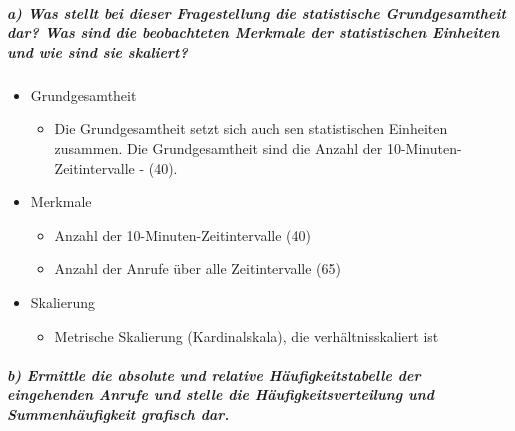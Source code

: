\documentclass[
]{article}
\providecommand{\tightlist}{%
  \setlength{\itemsep}{0pt}\setlength{\parskip}{0pt}}
\begin{document}
\hypertarget{a-was-stellt-bei-dieser-fragestellung-die-statistische-grundgesamtheit-dar-was-sind-die-beobachteten-merkmale-der-statistischen-einheiten-und-wie-sind-sie-skaliert}{%
\subparagraph{\texorpdfstring{\textbf{a) Was stellt bei dieser
Fragestellung die statistische Grundgesamtheit dar? Was sind die
beobachteten Merkmale der statistischen Einheiten und wie sind sie
skaliert?}}{a) Was stellt bei dieser Fragestellung die statistische Grundgesamtheit dar? Was sind die beobachteten Merkmale der statistischen Einheiten und wie sind sie skaliert?}}\label{a-was-stellt-bei-dieser-fragestellung-die-statistische-grundgesamtheit-dar-was-sind-die-beobachteten-merkmale-der-statistischen-einheiten-und-wie-sind-sie-skaliert}}

\begin{itemize}
\tightlist
\item
  Grundgesamtheit

  \begin{itemize}
  \tightlist
  \item
    Die Grundgesamtheit setzt sich auch sen statistischen Einheiten
    zusammen. Die Grundgesamtheit sind die Anzahl der
    10-Minuten-Zeitintervalle - (40).
  \end{itemize}
\item
  Merkmale

  \begin{itemize}
  \tightlist
  \item
    Anzahl der 10-Minuten-Zeitintervalle (40)
  \item
    Anzahl der Anrufe über alle Zeitintervalle (65)
  \end{itemize}
\item
  Skalierung

  \begin{itemize}
  \tightlist
  \item
    Metrische Skalierung (Kardinalskala), die verhältnisskaliert ist
  \end{itemize}
\end{itemize}

\hypertarget{b-ermittle-die-absolute-und-relative-huxe4ufigkeitstabelle-der-eingehenden-anrufe-und-stelle-die-huxe4ufigkeitsverteilung-und-summenhuxe4ufigkeit-grafisch-dar.}{%
\subparagraph{\texorpdfstring{\textbf{b) Ermittle die absolute und
relative Häufigkeitstabelle der eingehenden Anrufe und stelle die
Häufigkeitsverteilung und Summenhäufigkeit grafisch
dar.}}{b) Ermittle die absolute und relative Häufigkeitstabelle der eingehenden Anrufe und stelle die Häufigkeitsverteilung und Summenhäufigkeit grafisch dar.}}\label{b-ermittle-die-absolute-und-relative-huxe4ufigkeitstabelle-der-eingehenden-anrufe-und-stelle-die-huxe4ufigkeitsverteilung-und-summenhuxe4ufigkeit-grafisch-dar.}}
\end{document}
